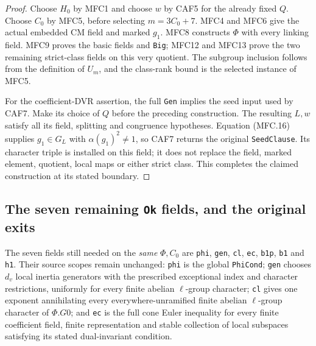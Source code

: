 \documentclass[11pt,a4paper]{article}
\numberwithin{equation}{section}
\theoremstyle{remark}\newtheorem{remark}[theorem]{Remark}
\begin{document}
\begin{proof}
Choose \(H_0\) by MFC1 and choose \(w\) by CAF5 for the
already fixed \(Q\).  Choose \(C_0\) by MFC5, before
selecting \(m=3C_0+7\).  MFC4 and MFC6 give the actual
embedded CM field and marked \(g_1\).  MFC8 constructs
\(\Phi\) with every linking field.  MFC9 proves the basic
fields and \texttt{Big}; MFC12 and MFC13 prove the two
remaining strict-class fields on this very quotient.
The subgroup inclusion follows from the definition of \(U_m\),
and the class-rank bound is the selected instance of MFC5.

For the coefficient-DVR assertion, the full \texttt{Gen}
implies the seed input used by CAF7.  Make its choice of
\(Q\) before the preceding construction.  The resulting
\(L,w\) satisfy all its field, splitting and congruence
hypotheses.  Equation (MFC.16) supplies
\(g_1\in G_L\) with \(\alpha(g_1)^2\ne1\), so CAF7
returns the original \texttt{Seed\allowbreak Clause}.  Its character
triple is installed on this field; it does not replace the
field, marked element, quotient, local maps or either strict class.
This completes the claimed construction at its stated boundary.
\end{proof}

\subsection{The seven remaining \texttt{Ok} fields, and the original exits}

The seven fields still needed on the \emph{same} \(\Phi,C_0\)
are \texttt{phi}, \texttt{gen}, \texttt{cl}, \texttt{ec},
\texttt{b1p}, \texttt{b1} and \texttt{h1}.
Their source scopes remain unchanged: \texttt{phi} is the
global \texttt{Phi\allowbreak Cond}; \texttt{gen} chooses \(d_v\) local
inertia generators with the prescribed exceptional index and
character restrictions, uniformly for every finite abelian
\(\ell\)-group character; \texttt{cl} gives one exponent
annihilating every everywhere-unramified finite abelian
\(\ell\)-group character of \(\Phi.G0\); and \texttt{ec}
is the full cone Euler inequality for every finite coefficient
field, finite representation and stable collection of local
subspaces satisfying its stated dual-invariant condition.
\end{document}
